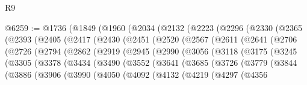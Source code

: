 \begin{lexlean}{R9}
\begin{coremodule}
@6259 := @1736
    (@1849
      (@1960
        (@2034
          (@2132
            (@2223
              (@2296
                (@2330
                  (@2365
                    (@2393
                      (@2405
                        (@2417
                          (@2430
                            (@2451
                              (@2520
                                (@2567
                                  (@2611
                                    (@2641
                                      (@2706
                                        (@2726
                                          (@2794
                                            (@2862
                                              (@2919
                                                (@2945
                                                  (@2990
                                                    (@3056
                                                      (@3118
                                                        (@3175
                                                          (@3245
                                                            (@3305
                                                              (@3378
                                                                (@3434
                                                                  (@3490
                                                                    (@3552
                                                                      (@3641
                                                                        (@3685
                                                                          (@3726
                                                                            (@3779
                                                                              (@3844
                                                                                (@3886
                                                                                  (@3906
                                                                                    (@3990
                                                                                      (@4050
                                                                                        (@4092
                                                                                          (@4132
                                                                                            (@4219
                                                                                              (@4297
                                                                                                (@4356

\end{coremodule}
\end{lexlean}
